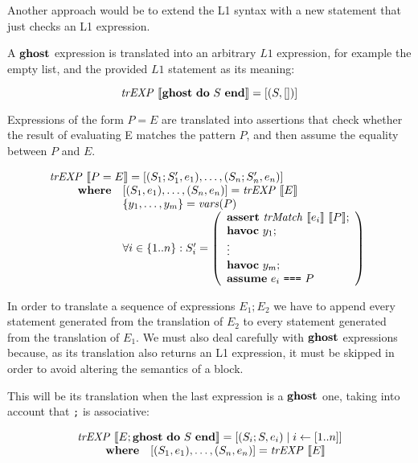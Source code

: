 Another approach would be to extend the L1 syntax with a new statement that just
checks an L1 expression.

A $\textbf{ghost}$ expression is translated into an arbitrary $L1$ expression, for
example the empty list, and the provided $L1$ statement as its meaning:

\[
\mathit{trEXP}~\llbracket\textbf{ghost}~\textbf{do}~S~\textbf{end}\rrbracket = [(S, [])]
\]

Expressions of the form $P = E$ are translated into assertions that check
whether the result of evaluating E matches the pattern $P$, and then assume the
equality between $P$ and $E$.

\[
\begin{array}{l}
\mathit{trEXP}~\llbracket P = E\rrbracket = [(S_1;S_1',e_1), \dots, (S_n;S_n', e_n)] \\
\qquad 
\begin{array}{ll}
\textbf{where} & [(S_1,e_1),\dots,(S_n, e_n)] = \mathit{trEXP}~\llbracket E\rrbracket \\
& \{y_1, \ldots, y_m\} = \mathit{vars}(P) \\
& \forall i \in \{1..n\}: S_i' = \left(
\begin{array}{l}
\textbf{assert}~\mathit{trMatch}~\llbracket e_i\rrbracket~\llbracket P\rrbracket;\\
\textbf{havoc}~y_1;\\
\vdots\\
\textbf{havoc}~y_m;\\
\textbf{assume}~e_i ~\texttt{===}~ P\\
\end{array}
\right)
\end{array}
\end{array}
\]

In order to translate a sequence of expressions $E_1;E_2$ we have to append 
every statement generated from the translation of $E_2$ to every statement 
generated from the translation of $E_1$. We must also deal carefully with
$\textbf{ghost}$ expressions because, as its translation also returns an L1 expression,
it must be skipped in order to avoid altering the semantics of a block.

This will be its translation when the last expression is a $\textbf{ghost}$ one, taking
into account that \verb|;| is associative:

\[
\begin{array}{l}
\mathit{trEXP}~\llbracket E;\textbf{ghost}~\textbf{do}~S~\textbf{end}\rrbracket = [(S_i;S,e_i) \mid i \leftarrow [1..n]] \\
\qquad 
\begin{array}{ll}
\textbf{where} & [(S_1,e_1),\dots,(S_n, e_n)] = \mathit{trEXP}~\llbracket E\rrbracket \\
\end{array}
\end{array}
\]

